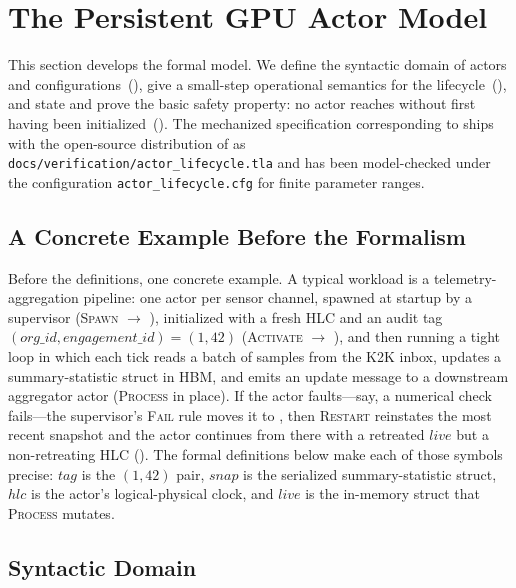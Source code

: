 \section{The Persistent GPU Actor Model}
\label{sec:model}

This section develops the formal model.  We define the syntactic
domain of actors and configurations~(), give
a small-step operational semantics for the
lifecycle~(), and state and prove the
basic safety property: no actor reaches \Active{} without first
having been initialized~().
The mechanized \TLA{} specification corresponding to
 ships with the open-source distribution
of \system{} as
\texttt{docs/verification/actor\_lifecycle.tla} and has been
model-checked under the configuration
\texttt{actor\_lifecycle.cfg} for finite parameter ranges.

\subsection{A Concrete Example Before the Formalism}
\label{sec:model:example}

Before the definitions, one concrete example.  A typical
\system{} workload is a telemetry-aggregation pipeline: one actor
per sensor channel, spawned at startup by a supervisor
(\textsc{Spawn} \(\to\) \Initializing{}), initialized with a fresh
HLC and an audit tag \((\mathit{org\_id},
\mathit{engagement\_id}) = (1, 42)\) (\textsc{Activate} \(\to\)
\Active{}), and then running a tight loop in which each tick
reads a batch of samples from the K2K inbox, updates a
summary-statistic struct in HBM, and emits an update message to a
downstream aggregator actor (\textsc{Process} in place).  If the
actor faults—say, a numerical check fails—the supervisor's
\textsc{Fail} rule moves it to \Failed{}, then \textsc{Restart}
reinstates the most recent snapshot and the actor continues from
there with a retreated \(\mathit{live}\) but a non-retreating HLC
().  The formal definitions below make each
of those symbols precise: \(\mathit{tag}\) is the \((1, 42)\) pair,
\(\mathit{snap}\) is the serialized summary-statistic struct,
\(\mathit{hlc}\) is the actor's logical-physical clock, and
\(\mathit{live}\) is the in-memory struct that \textsc{Process}
mutates.

\subsection{Syntactic Domain}
\label{sec:model:syntax}

